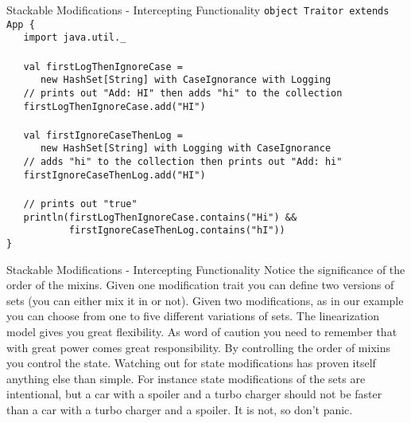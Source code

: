\begin{frame}[fragile]{Stackable Modifications - Intercepting Functionality}
\lstinline!object Traitor extends App {!\\
\lstinline!   import java.util._!\\
\lstinline!!\\
\lstinline!   val firstLogThenIgnoreCase =!\\
\lstinline!      new HashSet[String] with CaseIgnorance with Logging!\\
\lstinline!   // prints out "Add: HI" then adds "hi" to the collection!\\
\lstinline!   firstLogThenIgnoreCase.add("HI")!\\
\lstinline!!\\
\lstinline!   val firstIgnoreCaseThenLog =!\\
\lstinline!      new HashSet[String] with Logging with CaseIgnorance!\\
\lstinline!   // adds "hi" to the collection then prints out "Add: hi"!\\
\lstinline!   firstIgnoreCaseThenLog.add("HI")!\\
\lstinline!!\\
\lstinline!   // prints out "true"!\\
\lstinline!   println(firstLogThenIgnoreCase.contains("Hi") &&!\\
\lstinline!           firstIgnoreCaseThenLog.contains("hI"))!\\
\lstinline!}!
\end{frame}

\begin{frame}{Stackable Modifications - Intercepting Functionality}
Notice the significance of the order of the mixins. Given one modification trait you can
define two versions of sets (you can either mix it in or not). Given two modifications,
as in our example you can choose from one to five different variations of sets. The
linearization model gives you great flexibility.
\newline
\newline
As word of caution you need to remember that with great power comes great responsibility.
By controlling the order of mixins you control the state. Watching out for state
modifications has proven itself anything else than simple. For instance state
modifications of the sets are intentional, but a car with a spoiler and a turbo charger should not
be faster than a car with a turbo charger and a spoiler. It is not, so don't
panic.
\end{frame}

